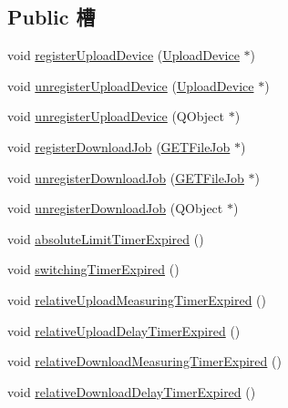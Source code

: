 \subsection*{Public 槽}
\begin{DoxyCompactItemize}
\item 
void \hyperlink{class_o_c_c_1_1_bandwidth_manager_a49541f57d165764c23ce88c335055d10}{register\+Upload\+Device} (\hyperlink{class_o_c_c_1_1_upload_device}{Upload\+Device} $\ast$)
\item 
void \hyperlink{class_o_c_c_1_1_bandwidth_manager_a793713019ac1efb046ea55772f46eb3e}{unregister\+Upload\+Device} (\hyperlink{class_o_c_c_1_1_upload_device}{Upload\+Device} $\ast$)
\item 
void \hyperlink{class_o_c_c_1_1_bandwidth_manager_a4d012872baebcd5c8845b11ab00c9c52}{unregister\+Upload\+Device} (Q\+Object $\ast$)
\item 
void \hyperlink{class_o_c_c_1_1_bandwidth_manager_aa016937a0d2fa03d608879bdec21d867}{register\+Download\+Job} (\hyperlink{class_o_c_c_1_1_g_e_t_file_job}{G\+E\+T\+File\+Job} $\ast$)
\item 
void \hyperlink{class_o_c_c_1_1_bandwidth_manager_a927b51e26cbe91be9b312eb9789ce905}{unregister\+Download\+Job} (\hyperlink{class_o_c_c_1_1_g_e_t_file_job}{G\+E\+T\+File\+Job} $\ast$)
\item 
void \hyperlink{class_o_c_c_1_1_bandwidth_manager_af2984ed97090875fec4d0b3ea5e81b64}{unregister\+Download\+Job} (Q\+Object $\ast$)
\item 
void \hyperlink{class_o_c_c_1_1_bandwidth_manager_af8458b1b18cc7572b873c69a3d58c14b}{absolute\+Limit\+Timer\+Expired} ()
\item 
void \hyperlink{class_o_c_c_1_1_bandwidth_manager_ad1468605b4e6eeee6ef82f383683bc91}{switching\+Timer\+Expired} ()
\item 
void \hyperlink{class_o_c_c_1_1_bandwidth_manager_ab216d2de3e0eaecff34a9cf7d6cc0054}{relative\+Upload\+Measuring\+Timer\+Expired} ()
\item 
void \hyperlink{class_o_c_c_1_1_bandwidth_manager_abffe1206d41dd131f9f82cc2365d8a2f}{relative\+Upload\+Delay\+Timer\+Expired} ()
\item 
void \hyperlink{class_o_c_c_1_1_bandwidth_manager_a71dd04382ff3321cfd5895928af98049}{relative\+Download\+Measuring\+Timer\+Expired} ()
\item 
void \hyperlink{class_o_c_c_1_1_bandwidth_manager_a54d889074a40dabdf539c4f335a97c5c}{relative\+Download\+Delay\+Timer\+Expired} ()
\end{DoxyCompactItemize}
